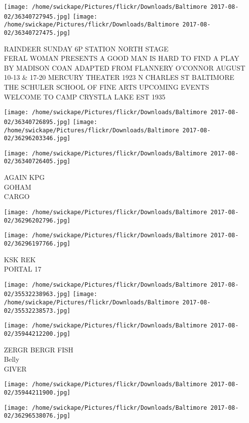 \documentclass[10pt,letterpaper]{article}
\begin{document}
\texttt{[image: /home/swickape/Pictures/flickr/Downloads/Baltimore 2017-08-02/36340727945.jpg]}
\texttt{[image: /home/swickape/Pictures/flickr/Downloads/Baltimore 2017-08-02/36340727475.jpg]}

RAINDEER SUNDAY 6P STATION NORTH STAGE\\
FERAL WOMAN PRESENTS A GOOD MAN IS HARD TO FIND A PLAY BY MADISON COAN ADAPTED FROM FLANNERY O'CONNOR AUGUST 10{-}13 \& 17{-}20 MERCURY THEATER 1923 N CHARLES ST BALTIMORE\\
THE SCHULER SCHOOL OF FINE ARTS UPCOMING EVENTS\\
WELCOME TO CAMP CRYSTLA LAKE EST 1935
\pagebreak

\texttt{[image: /home/swickape/Pictures/flickr/Downloads/Baltimore 2017-08-02/36340726895.jpg]}
\texttt{[image: /home/swickape/Pictures/flickr/Downloads/Baltimore 2017-08-02/36296203346.jpg]}

\texttt{[image: /home/swickape/Pictures/flickr/Downloads/Baltimore 2017-08-02/36340726405.jpg]}

AGAIN KPG\\
GOHAM\\
CARGO
\pagebreak

\texttt{[image: /home/swickape/Pictures/flickr/Downloads/Baltimore 2017-08-02/36296202796.jpg]}

\vspace{0.25in}
\texttt{[image: /home/swickape/Pictures/flickr/Downloads/Baltimore 2017-08-02/36296197766.jpg]}

KSK REK\\
PORTAL 17
\pagebreak

\texttt{[image: /home/swickape/Pictures/flickr/Downloads/Baltimore 2017-08-02/35532238963.jpg]}
\texttt{[image: /home/swickape/Pictures/flickr/Downloads/Baltimore 2017-08-02/35532238573.jpg]}

\texttt{[image: /home/swickape/Pictures/flickr/Downloads/Baltimore 2017-08-02/35944212200.jpg]}

ZERGR BERGR FISH\\
Belly\\
GIVER
\pagebreak

\texttt{[image: /home/swickape/Pictures/flickr/Downloads/Baltimore 2017-08-02/35944211900.jpg]}

\vspace{0.25in}
\texttt{[image: /home/swickape/Pictures/flickr/Downloads/Baltimore 2017-08-02/36296538076.jpg]}
\end{document}

